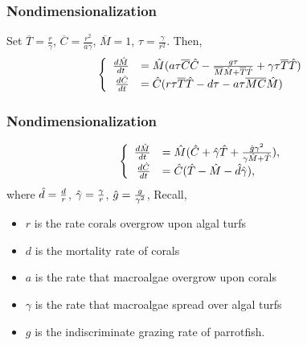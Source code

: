 {\center
\begin{frame}\frametitle{Nondimensionalization}Set $\overline{T}=\frac{r}{\gamma}$, $\overline{C}=\frac{r^2}{a\gamma}$, $\overline{M}=1$, $\tau=\frac{\gamma}{r^2}$. Then, $$\begin{cases}
\begin{array}{rl}
\frac{d\HAT{M}}{dt}&= \HAT{M}(a\tau\overline{C}\HAT{C}-\frac{g\tau}{\overline{M}\HAT{M}+\overline{T}\HAT{T}} + \gamma \tau\overline{T}\HAT{T})\\ 
\frac{d\HAT{C}}{dt}&=\HAT{C}(r\tau\overline{T}\HAT{T}-d\tau-a\tau\overline{M}\overline{C}\HAT{M})
\end{array} \end{cases}$$ 
\end{frame}
}

\begin{frame}\frametitle{Nondimensionalization}$$\begin{cases}
\begin{array}{rl}
\frac{d\HAT{M}}{dt}&= \HAT{M}(\HAT{C}+\HAT{\gamma}\HAT{T}+\frac{\HAT{g}\gamma^2}{\gamma\HAT{M}+ \HAT{T}}), \\ 
\frac{d\HAT{C}}{dt}&=\HAT{C}(\HAT{T}-\HAT{M}-\HAT{d}\HAT{\gamma}),
\end{array} \end{cases}$$ where $\HAT{d}=\frac{d}{r}$, $\HAT{\gamma} =\frac{\gamma}{r}$, $\HAT{g}=\frac{g}{\gamma^2}$,  Recall, \begin{itemize}\itemsep0pt
\item $r$ is the rate corals overgrow upon algal turfs\\
\item $d$ is the mortality rate of corals\\
\item $a$ is the rate that macroalgae overgrow upon corals\\
\item $\gamma$ is the rate that macroalgae spread over algal turfs\\
\item $g$ is the indiscriminate grazing rate of parrotfish.
\end{itemize}
\end{frame}


